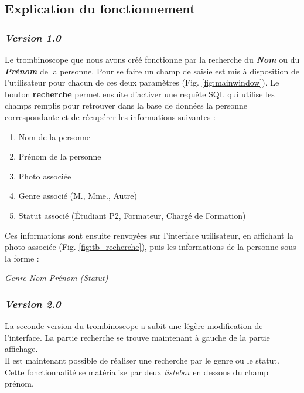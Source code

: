 \documentclass[french]{article}
\begin{document}
\subsection{Explication du fonctionnement}

\subsubsection{\textit{Version 1.0}}
Le trombinoscope que nous avons créé fonctionne par la recherche du \textbf{\textit{Nom}} ou du \textbf{\textit{Prénom}} de la personne. Pour se faire un champ de saisie est mis à disposition de l'utilisateur pour chacun de ces deux paramètres (Fig. \ref{fig:mainwindow}). Le bouton \textbf{recherche} permet ensuite d'activer une requête SQL qui utilise les champs remplis pour retrouver dans la base de données la personne correspondante et de récupérer les informations suivantes :
\begin{enumerate}
    \item Nom de la personne
    \item Prénom de la personne
    \item Photo associée
    \item Genre associé (M., Mme., Autre)
    \item Statut associé (Étudiant P2, Formateur, Chargé de Formation)\\
\end{enumerate}

\noindent Ces informations sont ensuite renvoyées sur l'interface utilisateur, en affichant la photo associée (Fig. \ref{fig:tb_recherche}), puis les informations de la personne sous la forme : 
\begin{center}
    \textit{Genre Nom Prénom (Statut)}\\
\end{center}

\subsubsection{\textit{Version 2.0}}

La seconde version du trombinoscope a subit une légère modification de l'interface. La partie recherche se trouve maintenant à gauche de la partie affichage.\\

Il est maintenant possible de réaliser une recherche par le genre ou le statut. Cette fonctionnalité se matérialise par deux \textit{listebox} en dessous du champ prénom.\\
\end{document}
